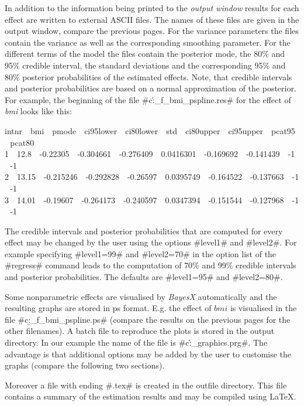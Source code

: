 \documentclass{article}
\begin{document}
In addition to the information being printed to the {\em output
window} results for each effect are written to external ASCII
files. The names of these files are given in the output window,
compare the previous pages. For the variance parameters the files
contain the variance as well as the corresponding smoothing
parameter. For the different terms of the model the files contain
the posterior mode, the 80\% and 95\% credible interval, the
standard deviations and the corresponding 95\% and 80\% posterior
probabilities of the estimated effects. Note, that credible
intervals and posterior probabilities are based on a normal
approximation of the posterior. For example, the beginning of the
file #c:\data\r_f_bmi_pspline.res# for the effect of {\em bmi}
looks like this:

{\footnotesize
 intnr \,\, bmi \,\, pmode \,\, ci95lower \,\, ci80lower \,\, std \,\, ci80upper \,\, ci95upper \,\, pcat95 \,\, pcat80\\
 1 \,\, 12.8 \,\, -0.22305 \,\, -0.304661 \,\, -0.276409 \,\, 0.0416301 \,\, -0.169692 \,\, -0.141439 \,\, -1 \,\, -1\\
 2 \,\, 13.15 \,\, -0.215246 \,\, -0.292828 \,\, -0.26597 \,\, 0.0395749 \,\, -0.164522 \,\, -0.137663 \,\, -1 \,\, -1\\
 3 \,\, 14.01 \,\, -0.19607 \,\, -0.264173 \,\, -0.240597 \,\, 0.0347394 \,\, -0.151544 \,\, -0.127968 \,\, -1 \,\, -1\\}

The credible intervals and posterior probabilities that are
computed for every effect may be changed by the user using the
options #level1# and #level2#. For example specifying #level1=99#
and #level2=70# in the option list of the #regress# command leads
to the computation of 70\% and 99\% credible intervals and
posterior probabilities. The defaults are #level1=95# and
#level2=80#.

Some nonparametric effects are visualised by {\em BayesX}
automatically and the resulting graphs are stored in ps format.
E.g. the effect of $bmi$ is visualised in the file
#c:\data\b_f_bmi_pspline.ps# (compare the results on the previous
pages for the other filenames). A batch file to reproduce the
plots is stored in the output directory. In our example the name
of the file is #c:\data\r_graphics.prg#. The advantage is that
additional options may be added by the user to customise the
graphs (compare the following two sections).

Moreover a file with ending #.tex# is created in the outfile
directory. This file contains a summary of the estimation results
and may be compiled using \LaTeX.
\end{document}
